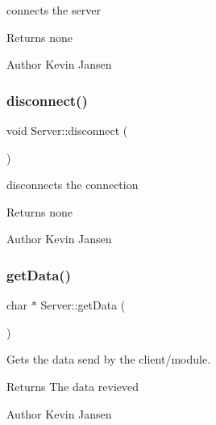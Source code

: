 connects the server 

\begin{DoxyReturn}{Returns}
none 
\end{DoxyReturn}
\begin{DoxyAuthor}{Author}
Kevin Jansen 
\end{DoxyAuthor}
\mbox{\label{classServer_acd0114484495cfd2749816ddb12e4246}} 
\subsubsection{\texorpdfstring{disconnect()}{disconnect()}}
{\footnotesize\ttfamily void Server\+::disconnect (\begin{DoxyParamCaption}{ }\end{DoxyParamCaption})}



disconnects the connection 

\begin{DoxyReturn}{Returns}
none 
\end{DoxyReturn}
\begin{DoxyAuthor}{Author}
Kevin Jansen 
\end{DoxyAuthor}
\mbox{\label{classServer_a6b6c39b02aeae611dcb2a9f2f5a8d801}} 
\subsubsection{\texorpdfstring{get\+Data()}{getData()}}
{\footnotesize\ttfamily char $\ast$ Server\+::get\+Data (\begin{DoxyParamCaption}{ }\end{DoxyParamCaption})}



Gets the data send by the client/module. 

\begin{DoxyReturn}{Returns}
The data revieved 
\end{DoxyReturn}
\begin{DoxyAuthor}{Author}
Kevin Jansen 
\end{DoxyAuthor}
\mbox{\label{classServer_a5061ce779b01e1c5cf8146022db8b08d}} 
